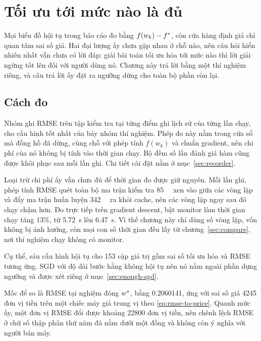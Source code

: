 \chapter{Tối ưu tới mức nào là đủ}
\label{sec:enough}

Mọi biểu đồ hội tụ trong báo cáo đo bằng $f(w_k) - f^{*}$, còn cửa hàng định
giá chỉ quan tâm sai số giá. Hai đại lượng ấy chưa gặp nhau ở chỗ nào, nên
câu hỏi hiển nhiên nhất vẫn chưa có lời đáp: giải bài toán tối ưu hóa tới mức nào thì
lời giải ngừng tốt lên đối với người dùng nó. Chương này trả lời bằng một thí
nghiệm riêng, và câu trả lời ấy đặt ra ngưỡng dừng cho toàn bộ phần còn lại.

\section{Cách đo}
\label{sec:enough-method}

Nhóm ghi RMSE trên tập kiểm tra tại từng điểm ghi lịch sử của từng lần chạy, cho
cấu hình tốt nhất của bảy nhóm thí nghiệm. Phép đo này nằm trong cửa sổ mà đồng
hồ đã dừng, cùng chỗ với phép tính $f(w_k)$ và chuẩn gradient, nên chi phí của
nó không bị tính vào thời gian chạy. Bộ đếm số lần đánh giá hàm cũng được khôi
phục sau mỗi lần ghi. Chi tiết cài đặt nằm ở mục~\ref{sec:recorder}.

Loại trừ chi phí ấy vẫn chưa đủ để thời gian đo được giữ nguyên. Mỗi lần ghi,
phép tính RMSE quét toàn bộ ma trận kiểm tra \SI{85}{\mebi\byte} xen vào giữa
các vòng lặp và đẩy ma trận huấn luyện \SI{342}{\mebi\byte} ra khỏi cache, nên
các vòng lặp ngay sau đó chạy chậm hơn. Đo trực tiếp trên gradient descent, bật
monitor làm thời gian chạy tăng 13\%, từ \SI{5.72}{\second} lên
\SI{6.47}{\second}. Vì thế chương này chỉ dùng số vòng lặp, vốn không bị ảnh
hưởng, còn mọi con số thời gian đều lấy từ chương~\ref{sec:compare}, nơi thí
nghiệm chạy không có monitor.

Cụ thể, sáu cấu hình hội tụ cho 153 cặp giá trị gồm sai số tối ưu hóa và RMSE
tương ứng. SGD với độ dài bước hằng không hội tụ nên nó nằm ngoài phần dựng
ngưỡng và được xét riêng ở mục~\ref{sec:enough-sgd}.

Mốc để so là RMSE tại nghiệm đóng $w^{*}$, bằng \num{0.2060141}, ứng với sai số
giá \num{4245} đơn vị tiền trên một chiếc máy giá trung vị theo
\eqref{eq:rmse-to-price}. Quanh mức ấy, một đơn vị RMSE đổi được khoảng
\num{22800} đơn vị tiền, nên chênh lệch RMSE ở chữ số thập phân thứ năm đã nằm
dưới một đồng và không còn ý nghĩa với người bán máy.

